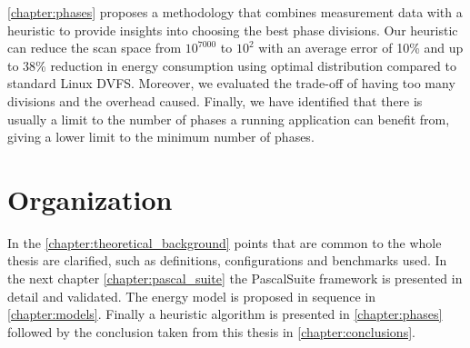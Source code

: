 \cref{chapter:phases} proposes a methodology that combines measurement data with a heuristic to provide insights into choosing the best phase divisions. Our heuristic can reduce the scan space from $10^{7000}$ to $10^2$ with an average error of 10\% and up to 38\% reduction in energy consumption using optimal distribution compared to standard Linux DVFS. Moreover, we evaluated the trade-off of having too many divisions and the overhead caused. Finally, we have identified that there is usually a limit to the number of phases a running application can benefit from, giving a lower limit to the minimum number of phases.


\section{Organization}

In the \cref{chapter:theoretical_background} points that are common to the whole thesis are clarified, such as definitions, configurations and benchmarks used. In the next chapter \cref{chapter:pascal_suite} the PascalSuite framework is presented in detail and validated. The energy model is proposed in sequence in \cref{chapter:models}. Finally a heuristic algorithm is presented in \cref{chapter:phases} followed by the conclusion taken from this thesis in \cref{chapter:conclusions}.
